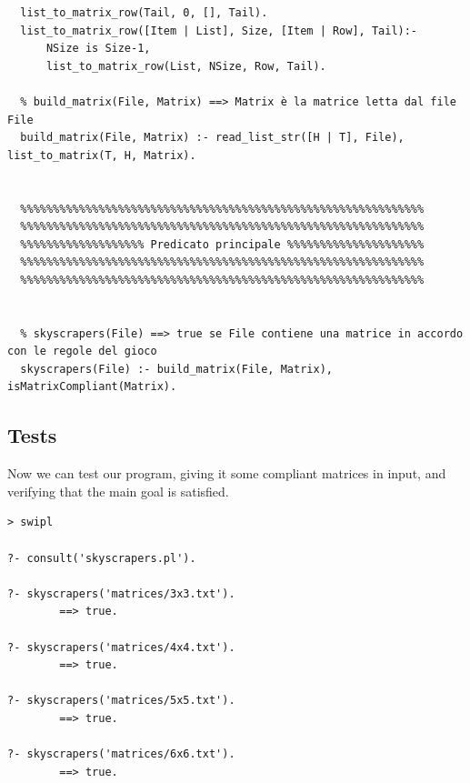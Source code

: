 \documentclass{article}
\begin{document}
\begin{lstlisting}
  list_to_matrix_row(Tail, 0, [], Tail).
  list_to_matrix_row([Item | List], Size, [Item | Row], Tail):-
      NSize is Size-1,
      list_to_matrix_row(List, NSize, Row, Tail).

  % build_matrix(File, Matrix) ==> Matrix è la matrice letta dal file File
  build_matrix(File, Matrix) :- read_list_str([H | T], File), list_to_matrix(T, H, Matrix).

  
  %%%%%%%%%%%%%%%%%%%%%%%%%%%%%%%%%%%%%%%%%%%%%%%%%%%%%%%%%%%%%%
  %%%%%%%%%%%%%%%%%%%%%%%%%%%%%%%%%%%%%%%%%%%%%%%%%%%%%%%%%%%%%%
  %%%%%%%%%%%%%%%%%%% Predicato principale %%%%%%%%%%%%%%%%%%%%%
  %%%%%%%%%%%%%%%%%%%%%%%%%%%%%%%%%%%%%%%%%%%%%%%%%%%%%%%%%%%%%%
  %%%%%%%%%%%%%%%%%%%%%%%%%%%%%%%%%%%%%%%%%%%%%%%%%%%%%%%%%%%%%%
  
  
  % skyscrapers(File) ==> true se File contiene una matrice in accordo con le regole del gioco
  skyscrapers(File) :- build_matrix(File, Matrix), isMatrixCompliant(Matrix).
\end{lstlisting}

\pagebreak

\subsection{Tests}

Now we can test our program, giving it some compliant matrices in input, and verifying that the main goal is satisfied.\\

\begin{verbatim}
> swipl

?- consult('skyscrapers.pl').

?- skyscrapers('matrices/3x3.txt').
  		==> true.

?- skyscrapers('matrices/4x4.txt').
  		==> true.

?- skyscrapers('matrices/5x5.txt').
  		==> true.

?- skyscrapers('matrices/6x6.txt').
  		==> true.
\end{verbatim}

\pagebreak

\renewcommand\refname{References}

\end{document}
